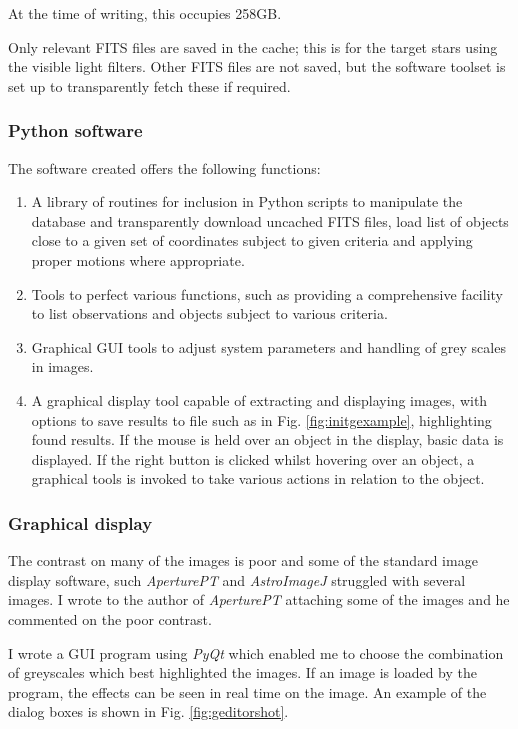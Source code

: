 At the time of writing, this occupies 258GB.

Only relevant FITS files are saved in the cache; this is for the target
{\rdwarf} stars using the visible light filters. Other FITS files are not saved, but the software
toolset is set up to transparently fetch these if required.

\subsubsection{Python software}
\protect\label{section:softlib}

The software created offers the following functions:

\begin{enumerate}
  \item A library of routines for inclusion in Python scripts to manipulate the
  database and transparently download uncached FITS files, load list of
  objects close to a given set of coordinates subject to given criteria and
  applying proper motions where appropriate.
  \item Tools to perfect various functions, such as providing a comprehensive
  facility to list observations and objects subject to various criteria.
  \item Graphical GUI tools to adjust system parameters and handling of grey
  scales in images.
  \item A graphical display tool capable of extracting and displaying images,
  with options to save results to file such as in Fig. \ref{fig:initgexample},
  highlighting found results. If the mouse is held over an object in the
  display, basic data is displayed. If the right button is clicked whilst
  hovering over an object, a graphical tools is invoked to take various actions
  in relation to the object.
\end{enumerate}

\subsubsection{Graphical display}
\protect\label{section:graphicdisplay}

The contrast on many of the images is poor and some of the standard image
display software, such \textit{AperturePT} and \textit{AstroImageJ} struggled
with several images. I wrote to the author of \textit{AperturePT} attaching some
of the images and he commented on the poor contrast.

I wrote a GUI program using \textit{PyQt} which enabled me to choose the
combination of greyscales which best highlighted the images. If an image is
loaded by the program, the effects can be seen in real time on the image. An
example of the dialog boxes is shown in Fig. \ref{fig:geditorshot}.

